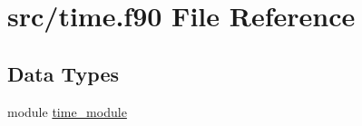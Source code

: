 \hypertarget{time_8f90}{\section{src/time.f90 File Reference}
\label{time_8f90}
}
\subsection*{Data Types}
\begin{DoxyCompactItemize}
\item 
module \hyperlink{classtime__module}{time\-\_\-module}
\end{DoxyCompactItemize}
